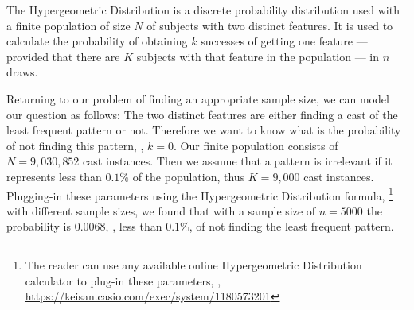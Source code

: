 The Hypergeometric Distribution is a discrete probability distribution used with a finite population of size $N$ of subjects with two distinct features.
It is used to calculate the probability of obtaining $k$ successes of getting one feature --- provided that there are $K$ subjects with that feature in the population --- in $n$ draws.

Returning to our problem of finding an appropriate sample size, we can model our question as follows:
The two distinct features are either finding a cast of the least frequent pattern or not.
Therefore we want to know what is the probability of not finding this pattern, \ie, $k = 0$.
Our finite population consists of $N = 9,030,852$ cast instances.
Then we assume that a pattern is irrelevant if it represents less than $0.1\%$ of the population, thus $K = 9,000$ cast instances.
Plugging-in these parameters using the Hypergeometric Distribution formula,%
\footnote{The reader can use any available online Hypergeometric Distribution calculator to plug-in these parameters, \eg, \url{https://keisan.casio.com/exec/system/1180573201}}
with different sample sizes, we found that with a sample size of $n = 5000$ the probability is $0.0068$, \ie, less than $0.1 \%$, of not finding the least frequent pattern.






